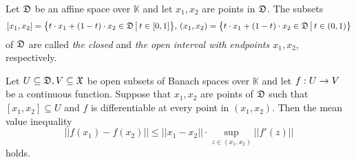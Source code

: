 \begin{definition}
Let ${\mathfrak D}$ be an affine space over $\mathbb{K}$ and let $x_1,x_2$ are points in ${\mathfrak D}$. The subsets
$$[x_1,x_2] = \big\{t\cdot x_1 + (1 - t)\cdot x_2\in {\mathfrak D}\,\big|\,t\in [0,1]\big\},\,(x_1,x_2) = \big\{t\cdot x_1 + (1 - t)\cdot x_2\in {\mathfrak D}\,\big|\,t\in (0,1)\big\}$$
of ${\mathfrak D}$ are called \textit{the closed} and \textit{the open interval with endpoints $x_1,x_2$}, respectively.
\end{definition}

\begin{theorem}\label{theorem:mean_value_inequality}
Let $U\subseteq {\mathfrak D},V\subseteq {\mathfrak X}$ be open subsets of Banach spaces over $\mathbb{K}$ and let $f:U\rightarrow V$ be a continuous function. Suppose that $x_1,x_2$ are points of ${\mathfrak D}$ such that $[x_1,x_2] \subseteq U$ and $f$ is differentiable at every point in $(x_1,x_2)$. Then the mean value inequality
$$||f(x_1) - f(x_2)||\leq ||x_1 - x_2||\cdot \sup_{z \in (x_1,x_2)}\big|\big|f'\left(z\right)\big|\big|$$
holds.
\end{theorem}
